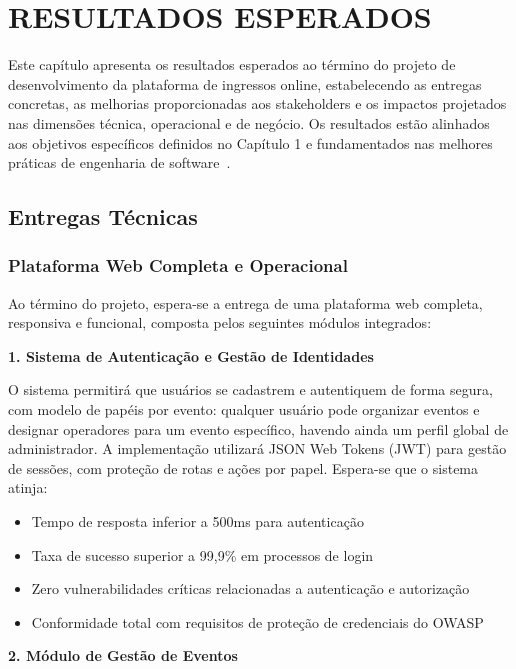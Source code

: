 \chapter{RESULTADOS ESPERADOS}

Este capítulo apresenta os resultados esperados ao término do projeto de desenvolvimento da plataforma de ingressos online, estabelecendo as entregas concretas, as melhorias proporcionadas aos stakeholders e os impactos projetados nas dimensões técnica, operacional e de negócio. Os resultados estão alinhados aos objetivos específicos definidos no Capítulo 1 e fundamentados nas melhores práticas de engenharia de software~\cite{Pressman:2019, Sommerville:2016}.

\section{Entregas Técnicas}

\subsection{Plataforma Web Completa e Operacional}

Ao término do projeto, espera-se a entrega de uma plataforma web completa, responsiva e funcional, composta pelos seguintes módulos integrados:

\textbf{1. Sistema de Autenticação e Gestão de Identidades}

O sistema permitirá que usuários se cadastrem e autentiquem de forma segura, com modelo de papéis por evento: qualquer usuário pode organizar eventos e designar operadores para um evento específico, havendo ainda um perfil global de administrador. A implementação utilizará JSON Web Tokens (JWT) para gestão de sessões, com proteção de rotas e ações por papel. Espera-se que o sistema atinja:

\begin{itemize}
    \item Tempo de resposta inferior a 500ms para autenticação
    \item Taxa de sucesso superior a 99,9\% em processos de login
    \item Zero vulnerabilidades críticas relacionadas a autenticação e autorização
    \item Conformidade total com requisitos de proteção de credenciais do OWASP~\cite{OWASP:2021}
\end{itemize}

\textbf{2. Módulo de Gestão de Eventos}

